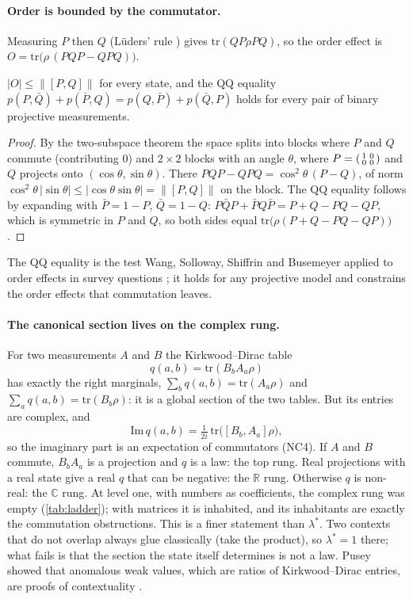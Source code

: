 \documentclass[11pt]{article}
\theoremstyle{definition}\newtheorem{definition}[theorem]{Definition}\newtheorem{remark}[theorem]{Remark}\newtheorem{example}[theorem]{Example}
\newcommand{\R}{\mathbb R}
\begin{document}
\paragraph{Order is bounded by the commutator.}
Measuring $P$ then $Q$ (Lüders' rule \cite{Luders1951}) gives $\mathrm{tr}(QP\rho PQ)$, so the order effect is
$O=\mathrm{tr}\big(\rho\,(PQP-QPQ)\big)$.

\begin{proposition}[NC2]\label{prop:order}
$|O|\le\|[P,Q]\|$ for every state, and the QQ equality $p(P,\bar Q)+p(\bar P,Q)=p(Q,\bar P)+p(\bar Q,P)$ holds for every pair of binary
projective measurements.
\end{proposition}

\begin{proof}
By the two-subspace theorem \cite{Halmos1969} the space splits into blocks where $P$ and $Q$ commute (contributing $0$) and $2\times2$
blocks with an angle $\theta$, where $P=\begin{psmallmatrix}1&0\\0&0\end{psmallmatrix}$ and $Q$ projects onto $(\cos\theta,\sin\theta)$. There
$PQP-QPQ=\cos^2\theta\,(P-Q)$, of norm $\cos^2\theta\,|\sin\theta|\le|\cos\theta\sin\theta|=\|[P,Q]\|$ on the block. The QQ equality follows by
expanding with $\bar P=1-P$, $\bar Q=1-Q$: $P\bar QP+\bar PQ\bar P=P+Q-PQ-QP$, which is symmetric in $P$ and $Q$, so both sides equal
$\mathrm{tr}\big(\rho(P+Q-PQ-QP)\big)$.
\end{proof}

The QQ equality is the test Wang, Solloway, Shiffrin and Busemeyer applied to order effects in survey questions
\cite{WangBusemeyer2014}; it holds for any projective model and constrains the order effects that commutation leaves.

\paragraph{The canonical section lives on the complex rung.}
For two measurements $A$ and $B$ the Kirkwood--Dirac table \cite{Kirkwood1933,Dirac1945,ArvidssonShukur2024}
\[
  q(a,b)=\mathrm{tr}(B_bA_a\rho)
\]
has exactly the right marginals, $\sum_bq(a,b)=\mathrm{tr}(A_a\rho)$ and $\sum_aq(a,b)=\mathrm{tr}(B_b\rho)$: it is a global section of the two
tables. But its entries are complex, and
\[
  \mathrm{Im}\,q(a,b)=\tfrac1{2i}\,\mathrm{tr}\big([B_b,A_a]\rho\big),
\]
so the imaginary part is an expectation of commutators (NC4). If $A$ and $B$ commute, $B_bA_a$ is a projection and $q$ is a law: the top
rung. Real projections with a real state give a real $q$ that can be negative: the $\R$ rung. Otherwise $q$ is non-real: the $\mathbb C$
rung. At level one, with numbers as coefficients, the complex rung was empty (\cref{tab:ladder}); with matrices it is inhabited, and its
inhabitants are exactly the commutation obstructions. This is a finer statement than $\lambda^*$. Two contexts that do not overlap
always glue classically (take the product), so $\lambda^*=1$ there; what fails is that the section the state itself determines is not a
law. Pusey showed that anomalous weak values, which are ratios of Kirkwood--Dirac entries, are proofs of contextuality
\cite{Pusey2014}.
\end{document}
